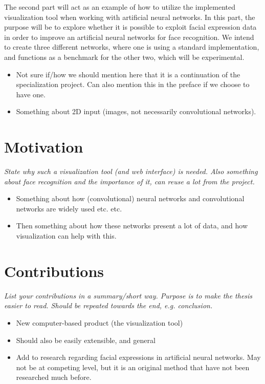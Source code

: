 \noindent The second part will act as an example of how to utilize the implemented visualization tool when working with artificial neural networks. In this part, the purpose will be to explore whether it is possible to exploit facial expression data in order to improve an artificial neural networks for face recognition. We intend to create three different networks, where one is using a standard implementation, and functions as a benchmark for the other two, which will be experimental.

\begin{itemize}
    \item Not sure if/how we should mention here that it is a continuation of the specialization project. Can also mention this in the preface if we choose to have one.
    \item Something about 2D input (images, not necessarily convolutional networks).
\end{itemize}

\section{Motivation}

\textit{State why such a visualization tool (and web interface) is needed. Also something about face recognition and the importance of it, can reuse a lot from the project.}

\begin{itemize}
    \item Something about how (convolutional) neural networks and convolutional networks are widely used etc. etc.
    \item Then something about how these networks present a lot of data, and how visualization can help with this.
\end{itemize}

\section{Contributions}

\textit{List your contributions in a summary/short way. Purpose is to make the thesis easier to read. Should be repeated towards the end, e.g. conclusion.}

\begin{itemize}
    \item New computer-based product (the visualization tool)
    \item Should also be easily extensible, and general
    \item Add to research regarding facial expressions in artificial neural networks. May not be at competing level, but it is an original method that have not been researched much before.
\end{itemize}

